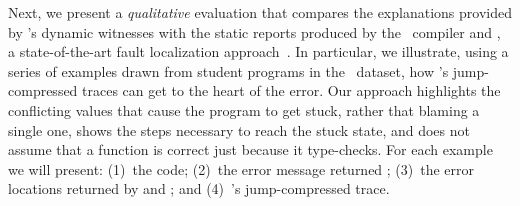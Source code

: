 Next, we present a \emph{qualitative} evaluation that compares
the explanations provided by \toolname's dynamic witnesses with
the static reports produced by the \ocaml\ compiler and \sherrloc,
a state-of-the-art fault localization approach~\cite{Zhang2014-lv}.
%
In particular, we illustrate, using a series of examples drawn
from student programs in the \ucsdbench\ dataset, how \toolname's
jump-compressed traces can get to the heart of the error. Our approach
%
highlights the conflicting values that cause the program to get
stuck, rather that blaming a single one,
%
shows the steps necessary to reach the stuck state, and
%
does not assume that a function is correct just because it type-checks.
%
For each example we will present:
(1)~the code;
(2)~the error message returned \ocaml;
(3)~the error locations returned by \hlOcaml{\ocaml} and \hlSherrloc{\sherrloc};
and (4)~\toolname's jump-compressed trace.



